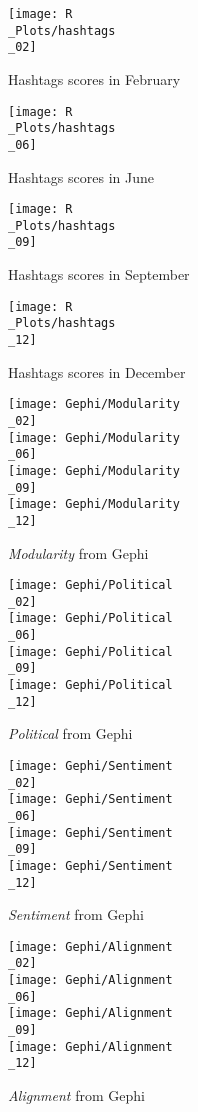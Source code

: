 \documentclass[twoside,twocolumn]{article}
\begin{document}
	
	\begin{figure}
		\texttt{[image: R\\\_Plots/hashtags\\\_02]}
		\caption{Hashtags scores in February}\label{fig:R_Hashtags_02}
	\end{figure}
	\begin{figure}
		\texttt{[image: R\\\_Plots/hashtags\\\_06]}
		\caption{Hashtags scores in June}\label{fig:R_Hashtags_06}
	\end{figure}
	\begin{figure}
		\texttt{[image: R\\\_Plots/hashtags\\\_09]}
		\caption{Hashtags scores in September}\label{fig:R_Hashtags_09}
	\end{figure}
	\begin{figure}
		\texttt{[image: R\\\_Plots/hashtags\\\_12]}
		\caption{Hashtags scores in December}\label{fig:R_Hashtags_12}
	\end{figure}
	
	\begin{figure}
		\texttt{[image: Gephi/Modularity\\\_02]}\\
		\texttt{[image: Gephi/Modularity\\\_06]}\\
		\texttt{[image: Gephi/Modularity\\\_09]}\\
		\texttt{[image: Gephi/Modularity\\\_12]}
		\caption{\textit{Modularity} from Gephi}\label{fig:Gephi_Modularity}
	\end{figure}
	\begin{figure}
		\texttt{[image: Gephi/Political\\\_02]}\\
		\texttt{[image: Gephi/Political\\\_06]}\\
		\texttt{[image: Gephi/Political\\\_09]}\\
		\texttt{[image: Gephi/Political\\\_12]}
		\caption{\textit{Political} from Gephi}\label{fig:Gephi_Political}
	\end{figure}
	\begin{figure}
		\texttt{[image: Gephi/Sentiment\\\_02]}\\
		\texttt{[image: Gephi/Sentiment\\\_06]}\\
		\texttt{[image: Gephi/Sentiment\\\_09]}\\
		\texttt{[image: Gephi/Sentiment\\\_12]}
		\caption{\textit{Sentiment} from Gephi}\label{fig:Gephi_Sentiment}
	\end{figure}
	\begin{figure}
		\texttt{[image: Gephi/Alignment\\\_02]}\\
		\texttt{[image: Gephi/Alignment\\\_06]}\\
		\texttt{[image: Gephi/Alignment\\\_09]}\\
		\texttt{[image: Gephi/Alignment\\\_12]}
		\caption{\textit{Alignment} from Gephi}\label{fig:Gephi_Alignment}
	\end{figure}
	
\end{document}
